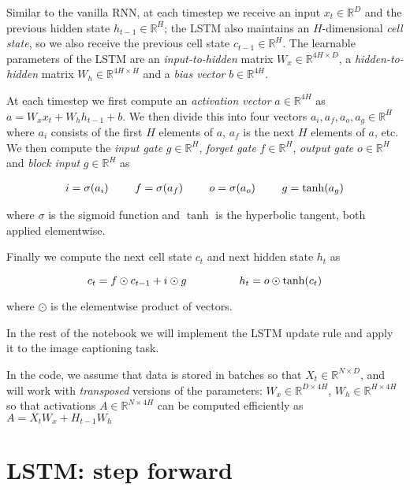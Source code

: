\documentclass[11pt]{article}
\begin{document}
Similar to the vanilla RNN, at each timestep we receive an input
\(x_t\in\mathbb{R}^D\) and the previous hidden state
\(h_{t-1}\in\mathbb{R}^H\); the LSTM also maintains an \(H\)-dimensional
\emph{cell state}, so we also receive the previous cell state
\(c_{t-1}\in\mathbb{R}^H\). The learnable parameters of the LSTM are an
\emph{input-to-hidden} matrix \(W_x\in\mathbb{R}^{4H\times D}\), a
\emph{hidden-to-hidden} matrix \(W_h\in\mathbb{R}^{4H\times H}\) and a
\emph{bias vector} \(b\in\mathbb{R}^{4H}\).

At each timestep we first compute an \emph{activation vector}
\(a\in\mathbb{R}^{4H}\) as \(a=W_xx_t + W_hh_{t-1}+b\). We then divide
this into four vectors \(a_i,a_f,a_o,a_g\in\mathbb{R}^H\) where \(a_i\)
consists of the first \(H\) elements of \(a\), \(a_f\) is the next \(H\)
elements of \(a\), etc. We then compute the \emph{input gate}
\(g\in\mathbb{R}^H\), \emph{forget gate} \(f\in\mathbb{R}^H\),
\emph{output gate} \(o\in\mathbb{R}^H\) and \emph{block input}
\(g\in\mathbb{R}^H\) as

\[
\begin{align*}
i = \sigma(a_i) \hspace{2pc}
f = \sigma(a_f) \hspace{2pc}
o = \sigma(a_o) \hspace{2pc}
g = \tanh(a_g)
\end{align*}
\]

where \(\sigma\) is the sigmoid function and \(\tanh\) is the hyperbolic
tangent, both applied elementwise.

Finally we compute the next cell state \(c_t\) and next hidden state
\(h_t\) as

\[
c_{t} = f\odot c_{t-1} + i\odot g \hspace{4pc}
h_t = o\odot\tanh(c_t)
\]

where \(\odot\) is the elementwise product of vectors.

In the rest of the notebook we will implement the LSTM update rule and
apply it to the image captioning task.

In the code, we assume that data is stored in batches so that
\(X_t \in \mathbb{R}^{N\times D}\), and will work with \emph{transposed}
versions of the parameters: \(W_x \in \mathbb{R}^{D \times 4H}\),
\(W_h \in \mathbb{R}^{H\times 4H}\) so that activations
\(A \in \mathbb{R}^{N\times 4H}\) can be computed efficiently as
\(A = X_t W_x + H_{t-1} W_h\)

    \section{LSTM: step forward}\label{lstm-step-forward}
\end{document}
